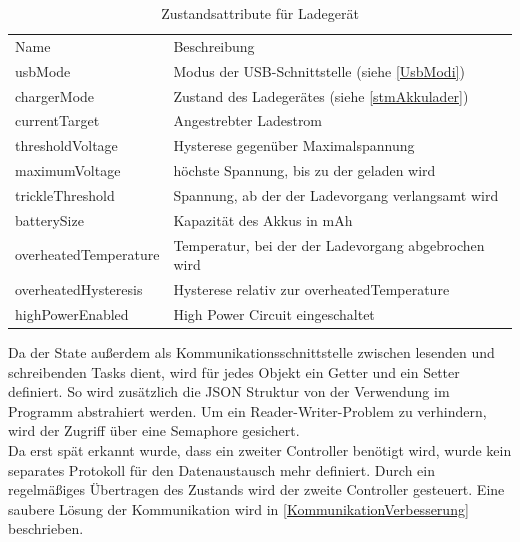 \documentclass[12pt,a4paper,bibliography=totocnumbered,listof=totocnumbered]{article}
\begin{document}
\begin{table}[H]
    \begin{center}
        \begin{tabular}{|l|l|}
            \hline
            Name                  & Beschreibung                                           \\
            \Xhline{3\arrayrulewidth}
            usbMode               & Modus der USB-Schnittstelle (siehe \autoref{UsbModi})  \\
            \hline
            chargerMode           & Zustand des Ladegerätes (siehe \autoref{stmAkkulader}) \\
            \hline
            currentTarget         & Angestrebter Ladestrom                                 \\
            \hline
            thresholdVoltage      & Hysterese gegenüber Maximalspannung                    \\
            \hline
            maximumVoltage        & höchste Spannung, bis zu der geladen wird              \\
            \hline
            trickleThreshold      & Spannung, ab der der Ladevorgang verlangsamt wird      \\
            \hline
            batterySize           & Kapazität des Akkus in mAh                             \\
            \hline
            overheatedTemperature & Temperatur, bei der der Ladevorgang abgebrochen wird  \\
            \hline
            overheatedHysteresis  & Hysterese relativ zur overheatedTemperature              \\
            \hline
            highPowerEnabled      & High Power Circuit eingeschaltet                       \\
            \hline
        \end{tabular}
        \caption{Zustandsattribute für Ladegerät}
        \label{tableStateCharger}
    \end{center}
\end{table}
Da der State außerdem als Kommunikationsschnittstelle zwischen lesenden und schreibenden Tasks dient, wird für jedes Objekt ein Getter und ein Setter definiert.
So wird zusätzlich die JSON Struktur von der Verwendung im Programm abstrahiert werden.
Um ein Reader-Writer-Problem zu verhindern, wird der Zugriff über eine Semaphore gesichert.\\
Da erst spät erkannt wurde, dass ein zweiter Controller benötigt wird, wurde kein separates Protokoll für den Datenaustausch mehr definiert.
Durch ein regelmäßiges Übertragen des Zustands wird der zweite Controller gesteuert.
Eine saubere Lösung der Kommunikation wird in \autoref{KommunikationVerbesserung} beschrieben.
\end{document}
